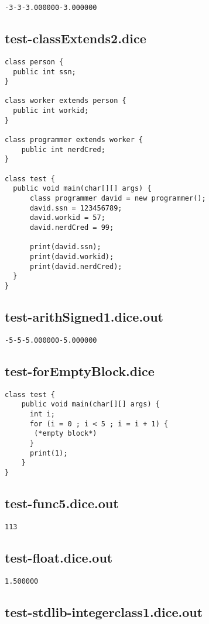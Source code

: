 \begin{verbatim}
-3-3-3.000000-3.000000
\end{verbatim}\pagebreak\subsection{test-classExtends2.dice}
\begin{verbatim}
class person {
  public int ssn;
}

class worker extends person {
  public int workid;
}

class programmer extends worker {
	public int nerdCred;
}

class test {
  public void main(char[][] args) {
      class programmer david = new programmer();
      david.ssn = 123456789;
      david.workid = 57;
      david.nerdCred = 99;

      print(david.ssn);
      print(david.workid);
      print(david.nerdCred);
  }
}
\end{verbatim}\pagebreak\subsection{test-arithSigned1.dice.out}
\begin{verbatim}
-5-5-5.000000-5.000000
\end{verbatim}\pagebreak\subsection{test-forEmptyBlock.dice}
\begin{verbatim}
class test {
	public void main(char[][] args) {
	  int i;
	  for (i = 0 ; i < 5 ; i = i + 1) {
	   (*empty block*)
	  }
	  print(1);
	}
}
\end{verbatim}\pagebreak\subsection{test-func5.dice.out}
\begin{verbatim}
113
\end{verbatim}\pagebreak\subsection{test-float.dice.out}
\begin{verbatim}
1.500000
\end{verbatim}\pagebreak\subsection{test-stdlib-integerclass1.dice.out}
